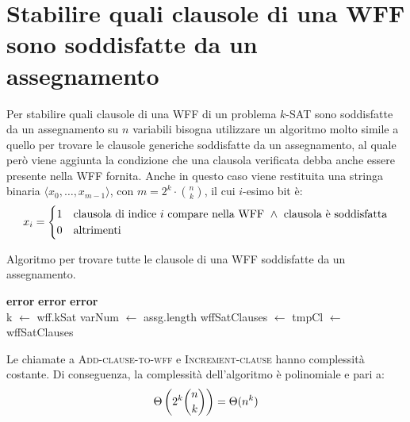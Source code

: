 \section{Stabilire quali clausole di una WFF sono soddisfatte da un assegnamento}
Per stabilire quali clausole di una WFF di un problema $k$-SAT sono soddisfatte da un assegnamento su $n$ variabili
bisogna utilizzare un algoritmo molto simile a quello per trovare le clausole generiche
soddisfatte da un assegnamento, al quale però viene aggiunta la condizione che una 
clausola verificata debba anche essere presente nella WFF fornita.
Anche in questo caso viene restituita una stringa binaria $\langle x_0, \ldots, x_{m - 1} \rangle$, con
$m = 2^k \cdot \binom{n}{k}$, il cui $i$-esimo bit è:
\begin{equation*}
    x_i = \begin{cases}
        1 & \textnormal{clausola di indice } i \textnormal{ compare nella WFF } \land \textnormal{ clausola è soddisfatta} \\
        0 & \textnormal{altrimenti}
    \end{cases}
\end{equation*}
\begin{algorithm}[H]
    \caption{Algoritmo per trovare tutte le clausole di una WFF soddisfatte da un assegnamento.}
    \label{alg:find_wff_sat_clauses}
    \begin{algorithmic}[1]
                \State \textbf{error}
            \EndIf
                \State \textbf{error}
            \EndIf
                \State \textbf{error}
            \EndIf\\

            \State k $\gets$ wff.kSat 
            \State varNum $\gets$ assg.length
            \State wffSatClauses $\gets$ 
            \State tmpCl $\gets$ \\

                    \State {}
                \EndIf
                \State {}
            \EndFor
            \State \Return wffSatClauses
        \EndProcedure
    \end{algorithmic}
\end{algorithm}
Le chiamate a \textsc{Add-clause-to-wff} e \textsc{Increment-clause} hanno complessità costante. Di conseguenza, la complessità dell'algoritmo è polinomiale e pari a:
\begin{equation*}
    \Theta \left(2^k \binom{n}{k}\right) = \Theta(n^k)
\end{equation*}

